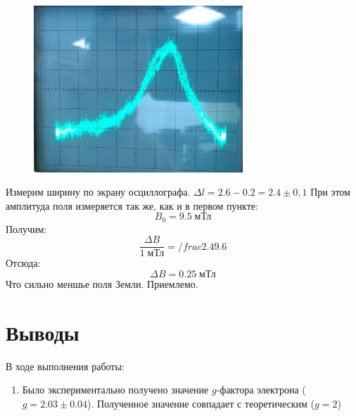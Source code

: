 \documentclass{article}
\begin{document}
\begin{figure}[H]
	\centering
	\includegraphics[width=0.7\textwidth]{Osc.jpeg}
\end{figure}

Измерим ширину по экрану осциллографа. \(\Delta l = 2.6 - 0.2 = 2.4 \pm 0,1\)
При этом амплитуда поля измеряется так же, как и в первом пункте: 
\[B_0 = 9.5\; \text{мТл}\]
Получим:
\[ \frac{\Delta B}{1\;\text{мТл}} = /frac{2.4}{9.6} \]
Отсюда:
\[\Delta B = 0.25\;\text{мТл}\]
Что сильно меншье поля Земли. Приемлемо.
\section{Выводы}
В ходе выполнения работы:
\begin{enumerate}
	\item Было экспериментально получено значение \(g\)-фактора электрона (\(g = 2.03 \pm 0.04\)). Полученное значение совпадает с теоретическим (\(g = 2\))
\end{enumerate}
\end{document}
